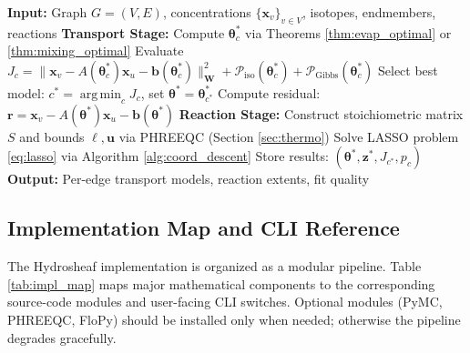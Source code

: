 \documentclass[12pt,a4paper]{article}
\theoremstyle{plain}
\theoremstyle{definition}
\theoremstyle{remark}
\DeclareMathOperator*{\argmin}{arg\,min}
\begin{document}
\begin{algorithm}
	\caption{Network-Level Geochemical Inversion}\label{alg:network_fit}
	\begin{algorithmic}[1]
		\State \textbf{Input:} Graph $G=(V,E)$, concentrations $\{\mathbf{x}_v\}_{v \in V}$, isotopes, endmembers, reactions
		\State \textbf{Transport Stage:}
		\State Compute $\boldsymbol{\theta}_c^*$ via Theorems \ref{thm:evap_optimal} or \ref{thm:mixing_optimal}
		\State Evaluate $J_c = \|\mathbf{x}_v - A(\boldsymbol{\theta}_c^*)\mathbf{x}_u - \mathbf{b}(\boldsymbol{\theta}_c^*)\|_{\mathbf{W}}^2 + \mathcal{P}_{\text{iso}}(\boldsymbol{\theta}_c^*) + \mathcal{P}_{\text{Gibbs}}(\boldsymbol{\theta}_c^*)$
		\EndFor
		\State Select best model: $c^* = \argmin_c J_c$, set $\boldsymbol{\theta}^* = \boldsymbol{\theta}_{c^*}^*$
		\State Compute residual: $\mathbf{r} = \mathbf{x}_v - A(\boldsymbol{\theta}^*)\mathbf{x}_u - \mathbf{b}(\boldsymbol{\theta}^*)$
		\State \textbf{Reaction Stage:}
		\State Construct stoichiometric matrix $S$ and bounds $\boldsymbol{\ell}, \mathbf{u}$ via PHREEQC (Section \ref{sec:thermo})
		\State Solve LASSO problem \eqref{eq:lasso} via Algorithm \ref{alg:coord_descent}
		\State Store results: $(\boldsymbol{\theta}^*, \mathbf{z}^*, J_{c^*}, p_c)$
		\EndFor
		\State \textbf{Output:} Per-edge transport models, reaction extents, fit quality
	\end{algorithmic}
\end{algorithm}

\subsection{Implementation Map and CLI Reference}

The Hydrosheaf implementation is organized as a modular pipeline. Table \ref{tab:impl_map} maps major mathematical components to the corresponding source-code modules and user-facing CLI switches. Optional modules (PyMC, PHREEQC, FloPy) should be installed only when needed; otherwise the pipeline degrades gracefully.
\end{document}
